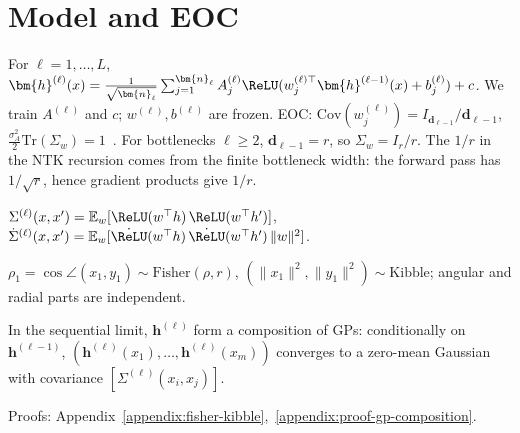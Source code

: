 \section{Model and EOC}\label{sec:network-definition}

For \( \ell=1,\dots,L \), \( \bm{h}^{(\ell)}(x) = \frac{1}{\sqrt{\bm{n}_\ell}} \sum_{j=1}^{\bm{n}_\ell} A^{(\ell)}_j \ReLU(w^{(\ell)\top}_j \bm{h}^{(\ell-1)}(x) + b^{(\ell)}_j) + c \). We train \( A^{(\ell)} \) and \( c \); \( w^{(\ell)}, b^{(\ell)} \) are frozen. EOC: \( \mathrm{Cov}(w^{(\ell)}_j) = I_{\bm{d}_{\ell-1}}/\bm{d}_{\ell-1} \), \( \frac{\sigma_A^2}{2}\mathrm{Tr}(\Sigma_w)=1 \)~\cite{hayou2018selectioninitializationactivationfunction}. For bottlenecks \( \ell\ge 2 \), \( \bm{d}_{\ell-1}=r \), so \( \Sigma_w = I_r/r \). The \( 1/r \) in the NTK recursion comes from the finite bottleneck width: the forward pass has \( 1/\sqrt{r} \), hence gradient products give \( 1/r \).

\begin{definition}\label{def:base-derivative-kernels}
\( \Sigma^{(\ell)}(x,x') = \mathbb{E}_w[\ReLU(w^\top h)\,\ReLU(w^\top h')] \), \( \dot{\Sigma}^{(\ell)}(x,x') = \mathbb{E}_w[\dot{\ReLU}(w^\top h)\,\dot{\ReLU}(w^\top h')\,\|w\|^2] \).
\end{definition}

\begin{lemma}\label{lem:fisher-kibble}
\( \rho_1 = \cos\angle(x_1,y_1) \sim \text{Fisher}(\rho,r) \), \( (\|x_1\|^2,\|y_1\|^2) \sim \text{Kibble} \); angular and radial parts are independent.
\end{lemma}

\begin{theorem}[GP composition]\label{thm:gp-composition}
In the sequential limit, \( \bm{h}^{(\ell)} \) form a composition of GPs: conditionally on \( \bm{h}^{(\ell-1)} \), \( (\bm{h}^{(\ell)}(x_1),\dots,\bm{h}^{(\ell)}(x_m)) \) converges to a zero-mean Gaussian with covariance \( [\Sigma^{(\ell)}(x_i,x_j)] \).
\end{theorem}
Proofs: Appendix~\ref{appendix:fisher-kibble},~\ref{appendix:proof-gp-composition}.
